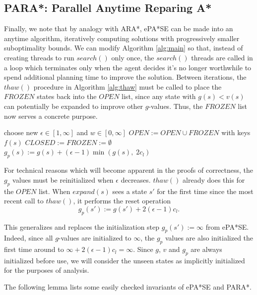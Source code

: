 \documentclass[letterpaper]{article}
\begin{document}
\subsection{PARA*: Parallel Anytime Reparing A*}

Finally, we note that by analogy with ARA*, ePA*SE can be made into an anytime algorithm, iteratively computing solutions with progressively smaller suboptimality bounds. We can modify Algorithm \ref{alg:main} so that, instead of creating threads to run $search()$ only once, the $search()$ threads are called in a loop which terminates only when the agent decides it's no longer worthwhile to spend additional planning time to improve the solution. Between iterations, the $thaw()$ procedure in Algorithm \ref{alg:thaw} must be called to place the $FROZEN$ states back into the $OPEN$ list, since any state with $g(s) < v(s)$ can potentially be expanded to improve other $g$-values. Thus, the $FROZEN$ list now serves a concrete purpose.

\begin{algorithm}
\caption{$thaw()$}
\label{alg:thaw}
\begin{algorithmic}
\STATE choose new $\epsilon \in [1,\infty]$ and $w \in [0,\infty]$
\STATE $OPEN := OPEN \cup FROZEN$ with keys $f(s)$
\STATE $CLOSED := FROZEN := \emptyset$
\STATE $g_p(s) := g(s) + (\epsilon-1)\min(g(s),\;2c_l)$
\ENDFOR
\end{algorithmic}
\end{algorithm}

For technical reasons which will become apparent in the proofs of correctness, the $g_p$ values must be reinitialized when $\epsilon$ decreases. $thaw()$ already does this for the $OPEN$ list. When $expand(s)$ sees a state $s'$ for the first time since the most recent call to $thaw()$, it performs the reset operation
\[g_p(s') := g(s') + 2(\epsilon-1)c_l.\]

This generalizes and replaces the initialization step $g_p(s') := \infty$ from ePA*SE. Indeed, since all $g$-values are initialized to $\infty$, the $g_p$ values are also initialized the first time around to $\infty +2(\epsilon-1)c_l = \infty$. Since $g$, $v$ and $g_p$ are always initialized before use, we will consider the unseen states as implicitly initialized for the purposes of analysis.

The following lemma lists some easily checked invariants of ePA*SE and PARA*.
\end{document}
